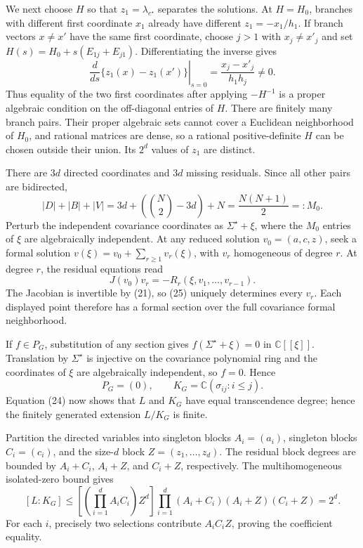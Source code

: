 We next choose \(H\) so that \(z_1=\lambda_{e^{\star}}\) separates the solutions.  At \(H=H_0\), branches with different first coordinate \(x_1\) already have different \(z_1=-x_1/h_1\).  If branch vectors \(x\ne x'\) have the same first coordinate, choose \(j>1\) with \(x_j\ne x'_j\) and set \(H(s)=H_0+s(E_{1j}+E_{j1})\).  Differentiating the inverse gives
\[
 \left.\frac{d}{ds}\{z_1(x)-z_1(x')\}\right|_{s=0}
 =\frac{x_j-x'_j}{h_1h_j}\ne0.
\tag{23}
\]
Thus equality of the two first coordinates after applying \(-H^{-1}\) is a proper algebraic condition on the off-diagonal entries of \(H\).  There are finitely many branch pairs.  Their proper algebraic sets cannot cover a Euclidean neighborhood of \(H_0\), and rational matrices are dense, so a rational positive-definite \(H\) can be chosen outside their union.  Its \(2^d\) values of \(z_1\) are distinct.

There are \(3d\) directed coordinates and \(3d\) missing residuals.  Since all other pairs are bidirected,
\[
 |D|+|B|+|V|
 =3d+\left(\binom N2-3d\right)+N
 =\frac{N(N+1)}2=:M_0.
\tag{24}
\]
Perturb the independent covariance coordinates as \(\Sigma^{\star}+\xi\), where the \(M_0\) entries of \(\xi\) are algebraically independent.  At any reduced solution \(v_0=(a,c,z)\), seek a formal solution \(v(\xi)=v_0+\sum_{r\ge1}v_r(\xi)\), with \(v_r\) homogeneous of degree \(r\).  At degree \(r\), the residual equations read
\[
 J(v_0)v_r=-R_r(\xi,v_1,\ldots,v_{r-1}).
\tag{25}
\]
The Jacobian is invertible by (21), so (25) uniquely determines every \(v_r\).  Each displayed point therefore has a formal section over the full covariance formal neighborhood.

If \(f\in P_G\), substitution of any section gives \(f(\Sigma^{\star}+\xi)=0\) in \(\mathbb C[[\xi]]\).  Translation by \(\Sigma^{\star}\) is injective on the covariance polynomial ring and the coordinates of \(\xi\) are algebraically independent, so \(f=0\).  Hence
\[
 P_G=(0),\qquad K_G=\mathbb C(\sigma_{ij}:i\le j).
\tag{26}
\]
Equation (24) now shows that \(L\) and \(K_G\) have equal transcendence degree; hence the finitely generated extension \(L/K_G\) is finite.

Partition the directed variables into singleton blocks \(A_i=(a_i)\), singleton blocks \(C_i=(c_i)\), and the size-\(d\) block \(Z=(z_1,\ldots,z_d)\).  The residual block degrees are bounded by \(A_i+C_i\), \(A_i+Z\), and \(C_i+Z\), respectively.  The multihomogeneous isolated-zero bound gives
\[
 [L:K_G]\le
 \left[\left(\prod_{i=1}^dA_iC_i\right)Z^d\right]
 \prod_{i=1}^d(A_i+C_i)(A_i+Z)(C_i+Z)=2^d.
\tag{27}
\]
For each \(i\), precisely two selections contribute \(A_iC_iZ\), proving the coefficient equality.

